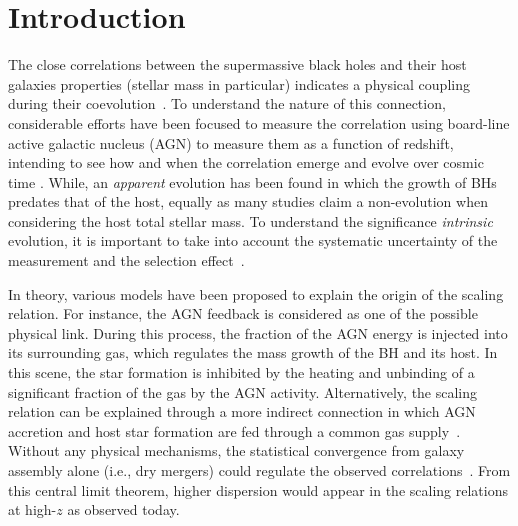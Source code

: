 \documentclass[twocolumn]{aastex631}
\begin{document}
\section{Introduction} \label{sec:intro}
The close correlations between the supermassive black holes and their host galaxies properties (stellar mass in particular) indicates a physical coupling during their coevolution~\citep{Mag++98, F+M00, M+H03, H+R04, Gul++09}. To understand the nature of this connection, considerable efforts have been focused to measure the correlation using board-line active galactic nucleus (AGN) to measure them as a function of redshift, intending to see how and when the correlation emerge and evolve over cosmic time \citep[e.g.,][]{Peng2006a, Tre++07, Woo++08, Jahnke2009, Bennert11, Schramm2013, Park15, Mechtley2016, Ding2020, 2021arXiv210902751L}. While, an {\it apparent} evolution has been found in which the growth of BHs predates that of the host, equally as many studies claim a non-evolution when considering the host total stellar mass. To understand the significance {\it intrinsic} evolution, it is important to take into account the systematic uncertainty of the measurement and the selection effect~\citep{Tre++07, Lauer2007, Schulze2014}. 

In theory, various models have been proposed to explain the origin of the scaling relation. For instance, the AGN feedback is considered as one of the possible physical link. During this process, the fraction of the AGN energy is injected into its surrounding gas, which regulates the mass growth of the BH and its host. In this scene, the star formation is inhibited by the heating and unbinding of a significant fraction of the gas by the AGN activity. Alternatively, the scaling relation can be explained through a more indirect connection in which AGN accretion and host star formation are fed through a common gas supply~\citep{Cen2015, Menci2016}. Without any physical mechanisms, the statistical convergence from galaxy assembly alone (i.e., dry mergers) could regulate the observed correlations~\citep{Peng2007, Jahnke2011, Hirschmann2010}. From this central limit theorem, higher dispersion would appear in the scaling relations at high-$z$ as observed today. 
\end{document}
